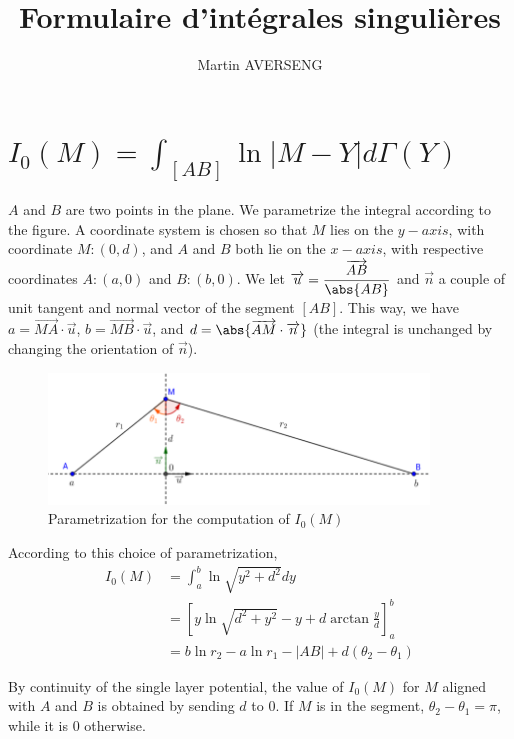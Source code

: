\documentclass[11pt,a4paper]{article}
\author{Martin AVERSENG}
\title{Formulaire d'intégrales singulières}
\begin{document}
\maketitle	

\section{$I_0(M) = \displaystyle\int_{[AB]} {\ln|M - Y|d\Gamma(Y)}$}

$A$ and $B$ are two points in the plane. We parametrize the integral according to the figure. A coordinate system is chosen so that $M$ lies on the $y-axis$, with coordinate $M : (0,d)$, and $A$ and $B$ both lie on the $x-axis$, with respective coordinates $A : (a,0)$ and $B : (b,0)$. We let $\overrightarrow{u} = \dfrac{\overrightarrow{AB}}{\abs{AB}}$ and $\overrightarrow{n}$ a couple of unit tangent and normal vector of the segment $[AB]$. This way, we have $a = \overrightarrow{MA}\cdot \overrightarrow{u}$, $b =  \overrightarrow{MB}\cdot \overrightarrow{u}$, and $d = \abs{\overrightarrow{AM} \cdot \overrightarrow{n}}$ (the integral is unchanged by changing the orientation of $\overrightarrow{n}$).
\begin{figure}[H]
\includegraphics[width=0.9\textwidth]{figureIntegraleSinguliere}
\caption{Parametrization for the computation of $I_0(M)$}
\label{fig:figureIntegraleSinguliere}
\end{figure}

According to this choice of parametrization,
\begin{align*}
	I_0(M) &= \int_{a}^b \ln \sqrt{y^2 + d^2} dy\\
	& = \left[y \ln \sqrt{d^2 + y^2}-y +d \arctan{\frac{y}{d}}\right]_a^b\\
	&= b \ln r_2 - a \ln{r_1} - |AB| + d (\theta_2 - \theta_1)
\end{align*}

By continuity of the single layer potential, the value of $I_0(M)$ for $M$ aligned with $A$ and $B$ is obtained by sending $d$ to $0$. If $M$ is in the segment, $\theta_2 - \theta_1 = \pi$, while it is $0$ otherwise. 
\end{document}
